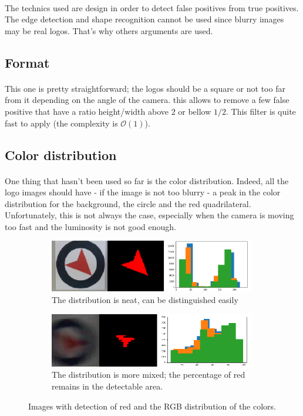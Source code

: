 \documentclass[12pt]{article}%
\begin{document}
\paragraph{}
The technics used are design in order to detect false positives from true positives. The edge detection and shape recognition cannot be used since blurry images may be real logos. That's why others arguments are used.

\subsection{Format}
\paragraph{}
This one is pretty straightforward; the logos should be a square or not too far from it depending on the angle of the camera. this allows to remove a few false positive that have a ratio height/width above $2$ or bellow $1/2$. This filter is quite fast to apply (the complexity is $\mathcal{O}(1)$).

\subsection{Color distribution}
\paragraph{}
One thing that hasn't been used so far is the color distribution. Indeed, all the logo images should have - if the image is not too blurry - a peak in the color distribution for the background, the circle and the red quadrilateral. Unfortunately, this is not always the case, especially when the camera is moving too fast and the luminosity is not good enough.


\captionsetup[subfigure]{labelformat=simple, labelsep=period}
\begin{figure}
	\centering
	\begin{subfigure}[t]{10cm}
		\centering
		\includegraphics[width=9cm]{images/colorDistrib1.png}
		\caption{The distribution is neat, can be distinguished easily}
	\end{subfigure}
	\begin{subfigure}[t]{10cm}
		\centering
		\includegraphics[width=9cm]{images/colorDistrib2.png}
		\caption{The distribution is more mixed; the percentage of red remains in the detectable area.}
	\end{subfigure}
	\caption{Images with detection of red and the RGB distribution of the colors.}\label{fig:colorDistrib}
\end{figure}
\end{document}
